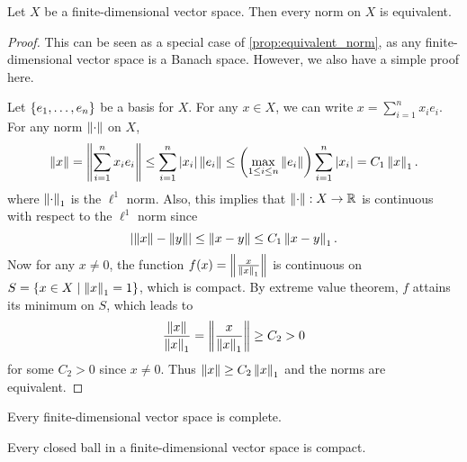 \begin{lemma}
    Let $X$ be a finite-dimensional vector space. Then every norm on 
    $X$ is equivalent.
\end{lemma}
\begin{proof}
    This can be seen as a special case of \cref{prop:equivalent_norm}, as any 
    finite-dimensional vector space is a Banach space. However, we also have a
    simple proof here. 

    Let $\left\{ {e_1,\ldots,e_n} \right\}$ be a basis for $X$. For any $x\in X$, we can write 
    $x = \sum_{i=1}^n x_ie_i$. For any norm $\left\lVert {\cdot} \right\rVert$ on $X$, 
    \begin{equation*}
        \norm{x} = \norm{\sum_{i=1}^n x_ie_i} \leq \sum_{i=1}^n \abs{x_i}\norm{e_i} 
        \leq \pth{\max_{1\leq i\leq n}\norm{e_i}}\sum_{i=1}^n\abs{x_i} = C_1\norm{x}_1.
    \end{equation*}
    where $\left\lVert {\cdot} \right\rVert_1$ is the $\ell^1$ norm. Also, this implies that 
    $\left\lVert {\cdot} \right\rVert:X\to\mathbb{R}$ is continuous with respect to the $\ell^1$ norm since 
    \begin{equation*}
        \left\lvert {\left\lVert {x} \right\rVert - \left\lVert {y} \right\rVert} \right\rvert \leq \left\lVert {x-y} \right\rVert \leq C_1\left\lVert {x-y} \right\rVert_1.
    \end{equation*}
    Now for any $x\neq 0$, the function $f(x) = \left\lVert {\frac{x}{\left\lVert {x} \right\rVert_1}} \right\rVert$ is 
    continuous on $S = \left\{ x\in X \;\middle\vert\; \left\lVert {x} \right\rVert_1 = 1 \right\}$, which is compact. 
    By extreme value theorem, $f$ attains its minimum on $S$, which leads to 
    \begin{equation*}
        \frac{\left\lVert {x} \right\rVert}{\left\lVert {x} \right\rVert_1} = \left\lVert {\frac{x}{\left\lVert {x} \right\rVert_1}} \right\rVert \geq C_2 > 0
    \end{equation*}
    for some $C_2 > 0$ since $x\neq 0$. Thus $\left\lVert {x} \right\rVert \geq C_2\left\lVert {x} \right\rVert_1$ and 
    the norms are equivalent.
\end{proof}

\begin{remark}
    Every finite-dimensional vector space is complete.
\end{remark}

\begin{remark}
    Every closed ball in a finite-dimensional vector space is compact.
\end{remark}

